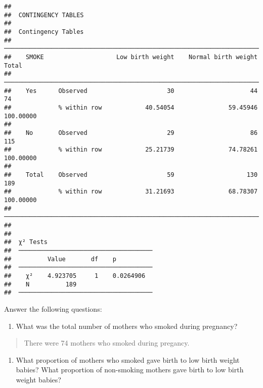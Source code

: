 \documentclass[
]{memoir}
\providecommand{\tightlist}{%
  \setlength{\itemsep}{0pt}\setlength{\parskip}{0pt}}
\begin{document}
\begin{verbatim}
## 
##  CONTINGENCY TABLES
## 
##  Contingency Tables                                                                
##  ───────────────────────────────────────────────────────────────────────────────── 
##    SMOKE                    Low birth weight    Normal birth weight    Total       
##  ───────────────────────────────────────────────────────────────────────────────── 
##    Yes      Observed                      30                     44           74   
##             % within row            40.54054               59.45946    100.00000   
##                                                                                    
##    No       Observed                      29                     86          115   
##             % within row            25.21739               74.78261    100.00000   
##                                                                                    
##    Total    Observed                      59                    130          189   
##             % within row            31.21693               68.78307    100.00000   
##  ───────────────────────────────────────────────────────────────────────────────── 
## 
## 
##  χ² Tests                              
##  ───────────────────────────────────── 
##          Value       df    p           
##  ───────────────────────────────────── 
##    χ²    4.923705     1    0.0264906   
##    N          189                      
##  ─────────────────────────────────────
\end{verbatim}

Answer the following questions:

\begin{enumerate}
\def\labelenumi{\alph{enumi})}
\tightlist
\item
  What was the total number of mothers who smoked during pregnancy?
\end{enumerate}

\begin{quote}
There were 74 mothers who smoked during pregancy.
\end{quote}

\begin{enumerate}
\def\labelenumi{\alph{enumi})}
\setcounter{enumi}{1}
\tightlist
\item
  What proportion of mothers who smoked gave birth to low birth weight babies? What proportion of non-smoking mothers gave birth to low birth weight babies?
\end{enumerate}
\end{document}
